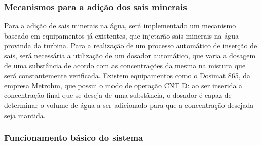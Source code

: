 \subsubsection{Mecanismos para a adição dos sais minerais}

  Para a adição de sais minerais na água, será implementado um mecanismo baseado em equipamentos já existentes, que injetarão
  sais minerais na água provinda da turbina. Para a realização de um processo automático de inserção de sais, será necessária 
  a utilização de um dosador automático, que varia a dosagem de uma substância de acordo com as concentrações da mesma na mistura 
  que será constantemente verificada. Existem equipamentos como o Dosimat 865, da empresa Metrohm, que possui o modo de operação
  CNT D: ao ser inserida a concentração final que se deseja de uma substância, o dosador é capaz de determinar o volume de água
  a ser adicionado para que a concentração desejada seja mantida.
  
\subsubsection{Funcionamento básico do sistema}

